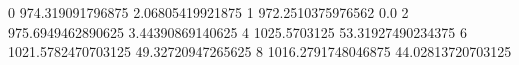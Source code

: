0 974.319091796875 2.06805419921875
1 972.2510375976562 0.0
2 975.6949462890625 3.44390869140625
4 1025.5703125 53.31927490234375
6 1021.5782470703125 49.32720947265625
8 1016.2791748046875 44.02813720703125
